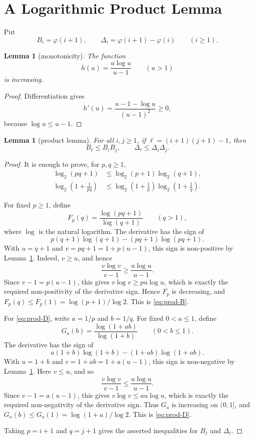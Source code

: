 \documentclass[11pt]{article}
\newtheorem{lemma}[theorem]{Lemma}
\newcommand{\ph}{\varphi}
\begin{document}
\section{A Logarithmic Product Lemma}

Put
\[
 B_i=\ph(i+1),\qquad
 \Delta_i=\ph(i+1)-\ph(i)
 \qquad (i\ge 1).
\]

\begin{lemma}[monotonicity]\label{lem:monotone}
The function
\[
 h(u)=\frac{u\log u}{u-1}\qquad (u>1)
\]
is increasing.
\end{lemma}

\begin{proof}
Differentiation gives
\[
 h'(u)=\frac{u-1-\log u}{(u-1)^2}\ge 0,
\]
because $\log u\le u-1$.
\end{proof}

\begin{lemma}[product lemma]\label{lem:product}
For all $i,j\ge 1$, if $\ell=(i+1)(j+1)-1$, then
\[
 B_\ell\le B_iB_j,
 \qquad
 \Delta_\ell\le \Delta_i\Delta_j.
\]
\end{lemma}

\begin{proof}
It is enough to prove, for $p,q\ge 1$,
\begin{align}
 \log_2(pq+1)&\le \log_2(p+1)\log_2(q+1), \label{eq:prod-B}\\
 \log_2\left(1+\frac1{pq}\right)
 &\le
 \log_2\left(1+\frac1p\right)
 \log_2\left(1+\frac1q\right). \label{eq:prod-D}
\end{align}

For fixed $p\ge 1$, define
\[
 F_p(q)=\frac{\log(pq+1)}{\log(q+1)}\qquad(q>1),
\]
where $\log$ is the natural logarithm.  The derivative has the sign of
\[
 p(q+1)\log(q+1)-(pq+1)\log(pq+1).
\]
With $u=q+1$ and $v=pq+1=1+p(u-1)$, this sign is non-positive by
Lemma~\ref{lem:monotone}.  Indeed, $v\ge u$, and hence
\[
 \frac{v\log v}{v-1}\ge \frac{u\log u}{u-1}.
\]
Since $v-1=p(u-1)$, this gives $v\log v\ge pu\log u$, which is exactly
the required non-positivity of the derivative sign.  Hence $F_p$ is
decreasing, and
$F_p(q)\le F_p(1)=\log(p+1)/\log 2$.  This is \eqref{eq:prod-B}.

For \eqref{eq:prod-D}, write $a=1/p$ and $b=1/q$.  For fixed
$0<a\le 1$, define
\[
 G_a(b)=\frac{\log(1+ab)}{\log(1+b)}\qquad(0<b\le 1).
\]
The derivative has the sign of
\[
 a(1+b)\log(1+b)-(1+ab)\log(1+ab).
\]
With $u=1+b$ and $v=1+ab=1+a(u-1)$, this sign is non-negative by
Lemma~\ref{lem:monotone}.  Here $v\le u$, and so
\[
 \frac{v\log v}{v-1}\le \frac{u\log u}{u-1}.
\]
Since $v-1=a(u-1)$, this gives $v\log v\le au\log u$, which is exactly
the required non-negativity of the derivative sign.  Thus $G_a$ is
increasing on $(0,1]$, and
$G_a(b)\le G_a(1)=\log(1+a)/\log 2$.  This is \eqref{eq:prod-D}.

Taking $p=i+1$ and $q=j+1$ gives the asserted inequalities for
$B_\ell$ and $\Delta_\ell$.
\end{proof}
\end{document}
